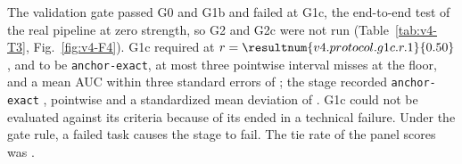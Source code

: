 The validation gate passed G0 and G1b and failed at G1c, the end-to-end test of the real pipeline at zero strength, so G2 and G2c were not run (Table~\ref{tab:v4-T3}, Fig.~\ref{fig:v4-F4}). %
G1c required    at $r=\resultnum{v4.protocol.g1c.r.1}{0.50}$,  and  to be \texttt{anchor-exact}, at most three pointwise interval misses at the  floor, and a mean AUC within three standard errors of ; the stage recorded  \texttt{anchor-exact} ,  pointwise  and a standardized mean deviation of . %
G1c could not be evaluated against its criteria because  of its   ended in a technical failure. Under the gate rule, a failed task causes the stage to fail. %
The tie rate of the panel scores was . %


